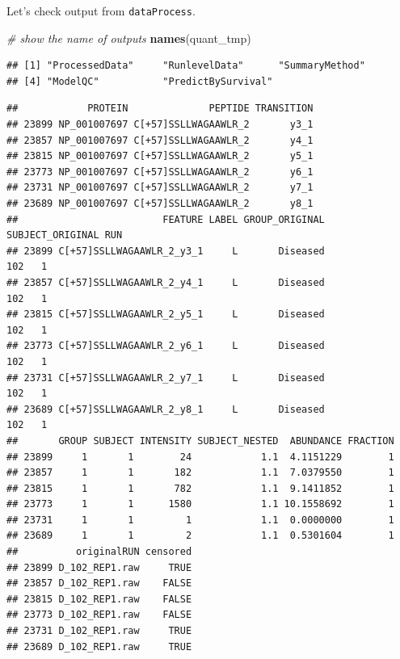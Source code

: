 \documentclass[]{book}
\newenvironment{Shaded}{\begin{snugshade}}{\end{snugshade}}
\newcommand{\CommentTok}[1]{\textcolor[rgb]{0.56,0.35,0.01}{\textit{#1}}}
\newcommand{\KeywordTok}[1]{\textcolor[rgb]{0.13,0.29,0.53}{\textbf{#1}}}
\newcommand{\NormalTok}[1]{#1}
\newcommand{\OperatorTok}[1]{\textcolor[rgb]{0.81,0.36,0.00}{\textbf{#1}}}
\begin{document}
Let's check output from \texttt{dataProcess}.

\begin{Shaded}
\begin{Highlighting}[]
\CommentTok{# show the name of outputs}
\KeywordTok{names}\NormalTok{(quant_tmp)}
\end{Highlighting}
\end{Shaded}

\begin{verbatim}
## [1] "ProcessedData"     "RunlevelData"      "SummaryMethod"    
## [4] "ModelQC"           "PredictBySurvival"
\end{verbatim}

\begin{Shaded}
\end{Shaded}

\begin{verbatim}
##            PROTEIN              PEPTIDE TRANSITION
## 23899 NP_001007697 C[+57]SSLLWAGAAWLR_2       y3_1
## 23857 NP_001007697 C[+57]SSLLWAGAAWLR_2       y4_1
## 23815 NP_001007697 C[+57]SSLLWAGAAWLR_2       y5_1
## 23773 NP_001007697 C[+57]SSLLWAGAAWLR_2       y6_1
## 23731 NP_001007697 C[+57]SSLLWAGAAWLR_2       y7_1
## 23689 NP_001007697 C[+57]SSLLWAGAAWLR_2       y8_1
##                         FEATURE LABEL GROUP_ORIGINAL SUBJECT_ORIGINAL RUN
## 23899 C[+57]SSLLWAGAAWLR_2_y3_1     L       Diseased              102   1
## 23857 C[+57]SSLLWAGAAWLR_2_y4_1     L       Diseased              102   1
## 23815 C[+57]SSLLWAGAAWLR_2_y5_1     L       Diseased              102   1
## 23773 C[+57]SSLLWAGAAWLR_2_y6_1     L       Diseased              102   1
## 23731 C[+57]SSLLWAGAAWLR_2_y7_1     L       Diseased              102   1
## 23689 C[+57]SSLLWAGAAWLR_2_y8_1     L       Diseased              102   1
##       GROUP SUBJECT INTENSITY SUBJECT_NESTED  ABUNDANCE FRACTION
## 23899     1       1        24            1.1  4.1151229        1
## 23857     1       1       182            1.1  7.0379550        1
## 23815     1       1       782            1.1  9.1411852        1
## 23773     1       1      1580            1.1 10.1558692        1
## 23731     1       1         1            1.1  0.0000000        1
## 23689     1       1         2            1.1  0.5301604        1
##          originalRUN censored
## 23899 D_102_REP1.raw     TRUE
## 23857 D_102_REP1.raw    FALSE
## 23815 D_102_REP1.raw    FALSE
## 23773 D_102_REP1.raw    FALSE
## 23731 D_102_REP1.raw     TRUE
## 23689 D_102_REP1.raw     TRUE
\end{verbatim}
\end{document}

